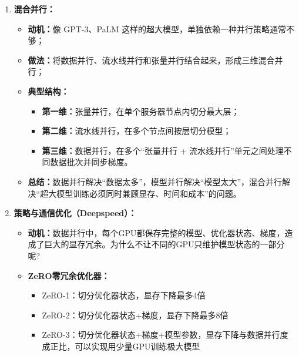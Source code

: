 \documentclass[../main.tex]{subfiles}
\begin{document}
\begin{enumerate}
    \item \textbf{混合并行：}
    \begin{itemize}
        \item \textbf{动机：}像 GPT-3、PaLM 这样的超大模型，单独依赖一种并行策略通常不够；
        \item \textbf{做法：}将数据并行、流水线并行和张量并行结合起来，形成三维混合并行；
        \item \textbf{典型结构：}
        \begin{itemize}
            \item \textbf{第一维：}张量并行，在单个服务器节点内切分最大层；
            \item \textbf{第二维：}流水线并行，在多个节点间按层切分模型；
            \item \textbf{第三维：}数据并行，在多个“张量并行 + 流水线并行”单元之间处理不同数据批次并同步梯度。
        \end{itemize}
        \item \textbf{总结：}数据并行解决“数据太多”，模型并行解决“模型太大”，混合并行解决“超大模型训练必须同时兼顾显存、时间和成本”的问题。
    \end{itemize}
    \item \textbf{策略与通信优化（Deepspeed）：}
    \begin{itemize}
        \item \textbf{动机：}数据并行中，每个GPU都保存完整的模型、优化器状态、梯度，造成了巨大的显存冗余。为什么不让不同的GPU只维护模型状态的一部分呢?
        \item \textbf{ZeRO零冗余优化器：}
        \begin{itemize}
            \item ZeRO-1：切分优化器状态，显存下降最多4倍
            \item ZeRO-2：切分优化器状态+梯度，显存下降最多8倍
            \item ZeRO-3：切分优化器状态+梯度+模型参数，显存下降与数据并行度成正比，可以实现用少量GPU训练极大模型           
        \end{itemize}
    \end{itemize}

\end{enumerate}
\end{document}
